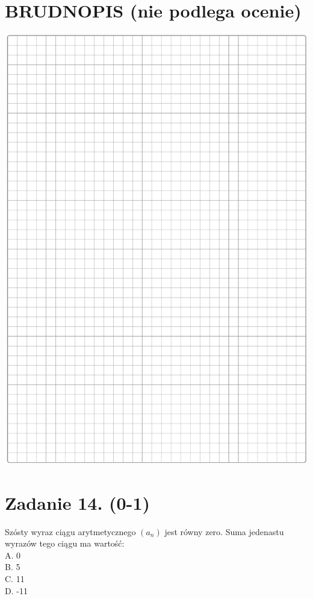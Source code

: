\documentclass[10pt]{article}
\begin{document}
\section*{BRUDNOPIS (nie podlega ocenie)}
\begin{center}
\includegraphics[max width=\textwidth]{2024_11_21_e15da647cf0a41077ac3g-05}
\end{center}

\section*{Zadanie 14. (0-1)}
Szósty wyraz ciągu arytmetycznego \(\left(a_{n}\right)\) jest równy zero. Suma jedenastu wyrazów tego ciągu ma wartość:\\
A. 0\\
B. 5\\
C. 11\\
D. -11
\end{document}

